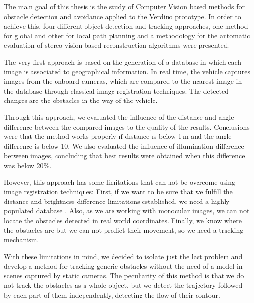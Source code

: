 

The main goal of this thesis is the study of Computer Vision based methods for obstacle detection and avoidance applied to the Verdino prototype. In order to achieve this, four different object detection and tracking approaches, one method for global and other for local path planning and a methodology for the automatic evaluation of stereo vision based reconstruction algorithms were presented.

The very first approach is based on the generation of a database in which each image is associated to geographical information. In real time, the vehicle captures images from the onboard cameras, which are compared to the nearest image in the database through classical image registration techniques. The detected changes are the obstacles in the way of the vehicle. 

Through this approach, we evaluated the influence of the distance and angle difference between the compared images to the quality of the results. Conclusions were that the method works properly if distance is below 1\,m and the angle difference is below 10\textdegree. We also evaluated the influence of illumination difference between images, concluding that best results were obtained when this difference was below 20\%.

However, this approach has some limitations that can not be overcome using image registration techniques: First, if we want to be sure that we fulfill the distance and brightness difference limitations established, we need a highly populated database . Also, as we are working with monocular images, we can not locate the obstacles detected in real world coordinates. Finally, we know where the obstacles are but we can not predict their movement, so we need a tracking mechanism.

With these limitations in mind, we decided to isolate just the last problem and develop a method for tracking generic obstacles without the need of a model in scenes captured by static cameras. The peculiarity of this method is that we do not track the obstacles as a whole object, but we detect the trajectory followed by each part of them independently, detecting the flow of their contour.

